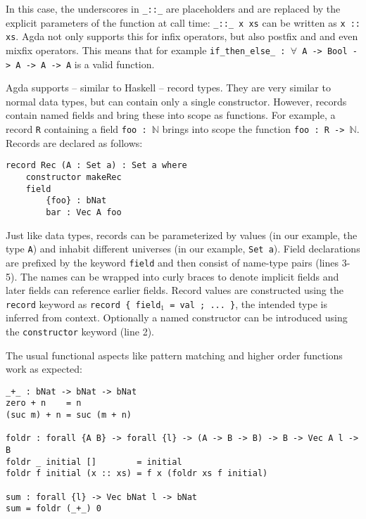 In this case, the underscores in \texttt{\_::\_} are placeholders and are replaced by the explicit parameters of the function at call time: \texttt{\_::\_ x xs} can be written as \texttt{x :: xs}. Agda not only supports this for infix operators, but also postfix and and even mixfix operators. This means that for example \texttt{if\_then\_else\_ : $\forall$ {A} -> Bool -> A -> A -> A} is a valid function.

Agda supports -- similar to Haskell -- record types. They are very similar to normal data types, but can contain only a single constructor. However, records contain named fields and bring these into scope as functions. For example, a record \texttt{R} containing a field \texttt{foo : $\mathbb N$} brings into scope the function \texttt{foo : R -> $\mathbb N$}. Records are declared as follows:

\noindent\begin{minipage}{\linewidth}
\begin{lstlisting}[caption={Record type declaration},label={lst:tutorial:record},emph={Rec,makeRec,foo,bar}]
record Rec (A : Set a) : Set a where
    constructor makeRec
    field
        {foo} : bNat
        bar : Vec A foo
\end{lstlisting}
\end{minipage}

Just like data types, records can be parameterized by values (in our example, the type \texttt{A}) and inhabit different universes (in our example, \texttt{Set a}). Field declarations are prefixed by the keyword \texttt{field} and then consist of name-type pairs (lines 3-5). The names can be wrapped into curly braces to denote implicit fields and later fields can reference earlier fields. Record values are constructed using the \texttt{record} keyword as \texttt{record \{ field$_1$ = val ; ... \}}, the intended type is inferred from context. Optionally a named constructor can be introduced using the \texttt{constructor} keyword (line 2).

The usual functional aspects like pattern matching and higher order functions work as expected:

\begin{lstlisting}[caption={Pattern matching and higher order functions},label={lst:tutorial:functional},emph={foldr,sum}]
_+_ : bNat -> bNat -> bNat
zero + n    = n
(suc m) + n = suc (m + n)

foldr : forall {A B} -> forall {l} -> (A -> B -> B) -> B -> Vec A l -> B
foldr _ initial []        = initial
foldr f initial (x :: xs) = f x (foldr xs f initial)

sum : forall {l} -> Vec bNat l -> bNat
sum = foldr (_+_) 0
\end{lstlisting}

